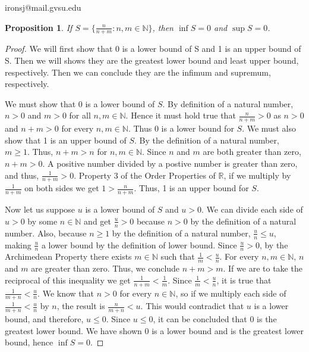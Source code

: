 \documentclass[11 pt]{article}
\newtheorem{proposition}{Proposition}
\newcommand{\newpar}{\vspace{.15in}\noindent}
\begin{document}
\noindent ironsj@mail.gvsu.edu
\newpar
\begin{proposition}
 If $S = \{\frac{n}{n+m}: n,m \in \mathbb{N}\}$, then $\inf{S}=0$ and $\sup{S}=0$.

\end{proposition}
\begin{proof}
We will first show that 0 is a lower bound of S and 1 is an upper bound of S. Then we will shows they are the greatest lower bound and least upper bound, respectively. Then we can conclude they are the infimum and supremum, respectively.

\newpar
We must show that 0 is a lower bound of $S$. By definition of a natural number, $n>0$ and $m>0$ for all $n,m \in \mathbb{N}$. Hence it must hold true that $\frac{n}{n+m}>0$ as $n>0$ and $n+m>0$ for every $n,m\in\mathbb{N}$. Thus 0 is a lower bound for $S$. We must also show that 1 is an upper bound of $S$. By the definition of a natural number, $m\ge 1$. Thus, $n+m>n$ for $n,m \in \mathbb{N}$. Since $n$ and $m$ are both greater than zero, $n+m>0$. A positive number divided by a postive number is greater than zero, and thus, $\frac{1}{n+m}>0$. Property 3 of the Order Properties of $\mathbb{R}$, if we multiply by $\frac{1}{n+m}$ on both sides we get $1>\frac{n}{n+m}$. Thus, 1 is an upper bound for $S$.

\newpar
 Now let us suppose $u$ is a lower bound of $S$ and $u>0$. We can divide each side of $u>0$ by some $n\in\mathbb{N}$ and get $\frac{u}{n}>0$ because $n>0$ by the definition of a natural number. Also, because $n\ge1$ by the definition of a natural number, $\frac{u}{n}\le u$, making $\frac{u}{n}$ a lower bound by the definition of lower bound. Since $\frac{u}{n}>0$, by the Archimedean Property there exists $m\in\mathbb{N}$ such that $\frac{1}{m}<\frac{u}{n}$. For every $n,m\in\mathbb{N}$, $n$ and $m$ are greater than zero. Thus, we conclude $n+m>m$. If we are to take the reciprocal of this inequality we get $\frac{1}{n+m}<\frac{1}{m}$. Since $\frac{1}{m}<\frac{u}{n}$, it is true that $\frac{1}{m+n}<\frac{u}{n}$. We know that $n>0$ for every $n\in\mathbb{N}$, so if we multiply each side of $\frac{1}{m+n}<\frac{u}{n}$ by $n$, the result is $\frac{n}{m+n}<u$. This would contradict that $u$ is a lower bound, and therefore, $u\le0$. Since $u\le0$, it can be concluded that 0 is the greatest lower bound. We have shown 0 is a lower bound and is the greatest lower bound, hence $\inf{S}=0$.



\end{proof}
\end{document}
